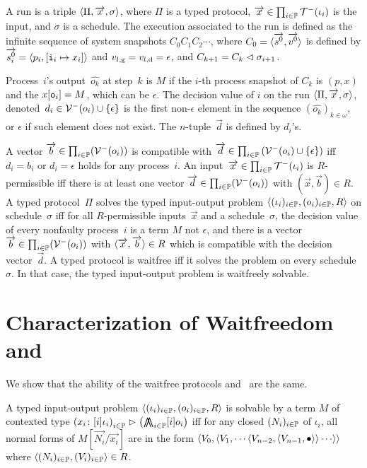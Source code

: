 {A run is a triple $\langle{\Pi, \overrightarrow x, \sigma}\rangle$,
where $\Pi$ is a typed protocol,
$\overrightarrow x \in \prod_{i\in \mathbb{P}} \mathcal{T}^-(\iota_i)$ is the input,
and $\sigma$ is a schedule.
The execution associated to the run
is defined as the infinite sequence of system snapshots
$C_0C_1C_2\cdots$, where $C_0 = \langle{\overrightarrow{s^0}, \overrightarrow{v^0}}\rangle$ is
defined by $\overrightarrow{s^0_i} = \langle{p_i, [\texttt{i}_i\mapsto x_i]}\rangle$ and
${v}_{l, \mathrm g}  = {v}_{l, \mathrm d} = \epsilon$,
and $C_{k+1} = C_{k}\vartriangleleft
\sigma_{i+1}$.

Process~$i$'s output~$\hat{o_k}$ at step~$k$ is
$M$ if the $i$-th process snapshot of $C_k$ is
$(p, x)$ and the $x[\texttt{o}_i] = M$, which can be $\epsilon$.
The decision value of $i$ on the run $\langle{\Pi,\overrightarrow x,\sigma}\rangle$,
denoted~$d_i \in \mathcal{V}^-(o_i)\cup\{\epsilon\}$
 is the first non-$\epsilon$ element in the sequence
 $\left(\hat{o_k}\right)_{k\in\omega}$,
 or
$\epsilon$ if such element does not exist.
The $n$-tuple~$\vec d$ is defined by $d_i$'s.

A vector $\overrightarrow b\in \prod_{i\in \mathbb{P}}(\mathcal{V}^-(o_i))$
is compatible with $\overrightarrow d \in \prod_{i\in
\mathbb{P}}\left(\mathcal{V}^-(o_i)\cup\{\epsilon\}\right)$ iff
$d_i = b_i$ or $d_i = \epsilon$ holds for any process~$i$.
An input~$\overrightarrow x\in \prod_{i\in \mathbb{P}}\mathcal{T}^-(\iota_i)$
is \linebreak[2] $R$-permissible iff there is at least one
vector $\overrightarrow d\in \prod_{i\in \mathbb{P}}(\mathcal{V}^-(o_i))$ with $(\vec x, \vec b)\in R$.
A typed protocol~$\Pi$ solves the typed input-output problem
  $\langle{(\iota_i)_{i\in \mathbb{P}}, (o_i)_{i\in \mathbb{P}}, R}\rangle$ on
schedule~$\sigma$ iff for all $R$-permissible inputs~$\vec x$ and a
schedule~$\sigma$,
 the decision value of every nonfaulty process~$i$ is a term
       $M$ not $\epsilon$, and
 there is a vector $\overrightarrow b\in \prod_{i\in \mathbb{P}}(\mathcal{V}^- (o_i))$
 with $\langle{\overrightarrow x, \overrightarrow b}\rangle \in R$ which is compatible with the
 decision vector~$\vec d$.
 A typed protocol is waitfree iff it solves
 the problem on every schedule~$\sigma$.
 In that case, the typed input-output problem is
 waitfreely solvable.

\section{Characterization of Waitfreedom and \lgd}
\label{comparison}

We show that the ability of the waitfree protocols and \lgd\, are the same.
\begin{definition}
 A typed input-output problem
 $\langle{(\iota_i)_{i\in \mathbb{P}}, (o_i)_{i\in \mathbb{P}}, R}\rangle$ is
 solvable by a term
 $M$ of contexted type
 $\left({x_i} \colon{[i]\iota_i}\right)_{i\in\mathbb{P}}
 \vartriangleright\left(\operatorname*{\bigwedge\kern -8pt \bigwedge}_{i\in
 \mathbb{P}}[i]o_i\right)$
 iff
 for any closed $(N_i)_{i\in \mathbb{P}}$ of $\iota_i$,
 all normal forms of $M[\vec{N_i}/\vec{x_i}]$
 are in the form
 $\langle{{V_0}, \langle{{V_1},
 \cdots\langle{{V_{n-2}},\langle{{V_{n-1}},\bullet}\rangle}\rangle\cdots}\rangle}\rangle$
 where $\langle{(N_i)_{i\in \mathbb{P}}, (V_i)_{i\in \mathbb{P}}}\rangle\in R$.
\end{definition}

}
